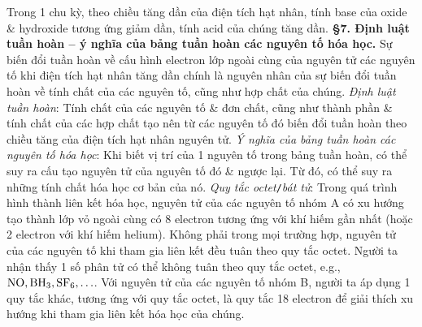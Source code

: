 \documentclass{article}
\numberwithin{equation}{section}
\begin{document}
Trong 1 chu kỳ, theo chiều tăng dần của điện tích hạt nhân, tính base của oxide \& hydroxide tương ứng giảm dần, tính acid của chúng tăng dần. \textbf{\S7. Định luật tuần hoàn -- ý nghĩa của bảng tuần hoàn các nguyên tố hóa học.} Sự biến đổi tuần hoàn về cấu hình electron lớp ngoài cùng của nguyên tử các nguyên tố khi điện tích hạt nhân tăng dần chính là nguyên nhân của sự biến đổi tuần hoàn về tính chất của các nguyên tố, cũng như hợp chất của chúng. \textit{Định luật tuần hoàn}: Tính chất của các nguyên tố \& đơn chất, cũng như thành phần \& tính chất của các hợp chất tạo nên từ các nguyên tố đó biến đổi tuần hoàn theo chiều tăng của điện tích hạt nhân nguyên tử. \textit{Ý nghĩa của bảng tuần hoàn các nguyên tố hóa học}: Khi biết vị trí của 1 nguyên tố trong bảng tuần hoàn, có thể suy ra cấu tạo nguyên tử của nguyên tố đó \& ngược lại. Từ đó, có thể suy ra những tính chất hóa học cơ bản của nó. \textit{Quy tắc octet}\texttt{/}\textit{bát tử}:  Trong quá trình hình thành liên kết hóa học, nguyên tử của các nguyên tố nhóm A có xu hướng tạo thành lớp vỏ ngoài cùng có 8 electron tương ứng với khí hiếm gần nhất (hoặc 2 electron với khí hiếm helium). Không phải trong mọi trường hợp, nguyên tử của các nguyên tố khi tham gia liên kết đều tuân theo quy tắc octet. Người ta nhận thấy 1 số phân tử có thể không tuân theo quy tắc octet, e.g., $\rm NO,BH_3,SF_6,\ldots$. Với nguyên tử của các nguyên tố nhóm B, người ta áp dụng 1 quy tắc khác, tương ứng với quy tắc octet, là quy tắc 18 electron để giải thích xu hướng khi tham gia liên kết hóa học của chúng.

\end{document}
